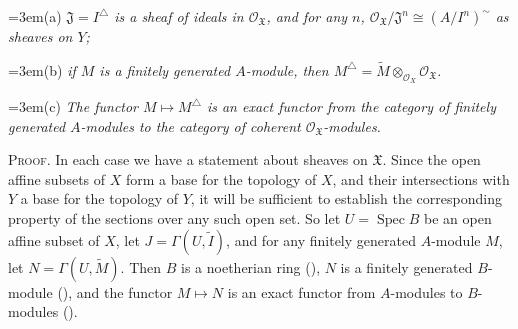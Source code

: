 {\noindent\hangindent=3em\hspace*{1.7em}\hypertarget{result-II-9.4-a}{}(a) \emph{$\mathfrak J=I^\triangle$ is a sheaf of ideals in $\mathcal O_{\mathfrak X}$, and for any $n$, $\mathcal O_{\mathfrak X}/\mathfrak J^n\cong(A/I^n)^\sim$ as sheaves on $Y$;}

\noindent\hangindent=3em\hspace*{1.7em}\hypertarget{result-II-9.4-b}{}(b) \emph{if $M$ is a finitely generated $A$-module, then $M^\triangle=\widetilde M\otimes_{\mathcal O_X}\mathcal O_{\mathfrak X}$.}

\noindent\hangindent=3em\hspace*{1.7em}\hypertarget{result-II-9.4-c}{}(c) \emph{The functor $M\mapsto M^\triangle$ is an exact functor from the category of finitely generated $A$-modules to the category of coherent $\mathcal O_{\mathfrak X}$-modules.}

\smallskip
\noindent\textsc{Proof.} In each case we have a statement about sheaves on $\mathfrak X$. Since the open affine subsets of $X$ form a base for the topology of $X$, and their intersections with $Y$ a base for the topology of $Y$, it will be sufficient to establish the corresponding property of the sections over any such open set. So let $U=\operatorname{Spec} B$ be an open affine subset of $X$, let $J=\Gamma(U,\widetilde I)$, and for any finitely generated $A$-module $M$, let $N=\Gamma(U,\widetilde M)$. Then $B$ is a noetherian ring (), $N$ is a finitely generated $B$-module (), and the functor $M\mapsto N$ is an exact functor from $A$-modules to $B$-modules ().}
